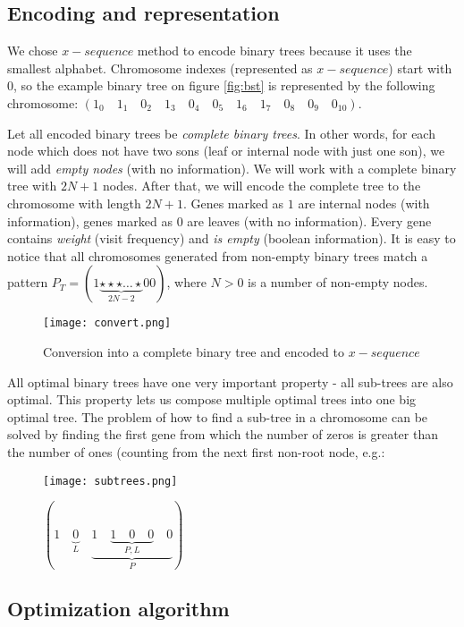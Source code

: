 \documentclass[12pt]{article}
\begin{document}
\subsection{Encoding and representation}
We chose $x-sequence$ method to encode binary trees because it uses the smallest alphabet.
Chromosome indexes (represented as $x-sequence$) start with $0$, so the example binary tree on figure \ref{fig:bst} is represented by the following chromosome: $(1_0\quad 1_1\quad  0_2\quad 1_3\quad 0_4\quad 0_5\quad 1_6\quad 1_7\quad 0_8\quad 0_9\quad 0_{10})$.

Let all encoded binary trees be \textit{complete binary trees}. In other words, for each node which does not have two sons (leaf or internal node with just one son), we will add \textit{empty nodes} (with no information). We will work with a complete binary tree with $2N + 1$ nodes. After that, we will encode the complete tree to the chromosome with length $2N + 1$.
Genes marked as $1$ are internal nodes (with information), genes marked as $0$ are leaves (with no information).
Every gene contains \textit{weight} (visit frequency) and \textit{is empty} (boolean information).
It is easy to notice that all chromosomes generated from non-empty binary trees match a pattern
$P_{T} = (1 \underbrace{\star \star \star \ldots \star}_{2N-2} 0 0)$, where $N > 0$ is a number of non-empty nodes.

\begin{figure}[ht]
\centering
\texttt{[image: convert.png]}
\caption{Conversion into a complete binary tree and encoded to $x-sequence$}
\label{fig:convert}
\end{figure}

All optimal binary trees have one very important property - all sub-trees are also optimal. This property lets us compose multiple optimal trees into one big optimal tree.
The problem of how to find a sub-tree in a chromosome can be solved by finding the first gene from which the number of zeros is greater  than the number of ones (counting from the next first non-root node, e.g.:

\clearpage
\begin{figure}[ht]
\centering
\texttt{[image: subtrees.png]}

$(1\quad\underbrace{0}_{L}\quad\underbrace{1\quad\underbrace{1\quad 0\quad 0}_{P,L}\quad 0}_{P})$
\label{fig:subtrees}
\end{figure}

\subsection{Optimization algorithm}
\end{document}
